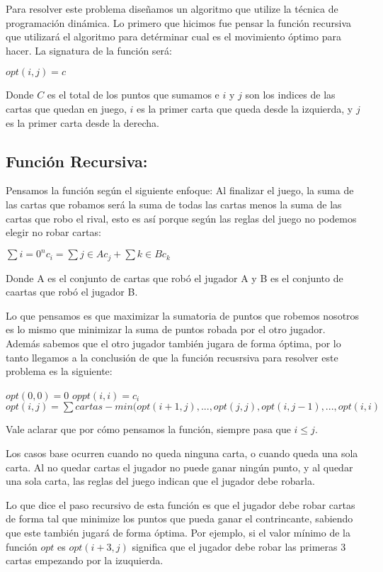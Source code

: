 Para resolver este problema diseñamos un algoritmo que utilize la técnica de programación dinámica. Lo primero que hicimos fue pensar la función recursiva que utilizará el algoritmo para detérminar cual es el movimiento óptimo para hacer. La signatura de la función será:

$opt(i,j) = c$

Donde $C$ es el total de los puntos que sumamos e $i$ y $j$ son los indices de las cartas que quedan en juego, $i$ es la primer carta que queda desde la izquierda, y $j$ es la primer carta desde la derecha.

\subsection{Función Recursiva:}

Pensamos la función según el siguiente enfoque: Al finalizar el juego, la suma de las cartas que robamos será la suma de todas las cartas menos la suma de las cartas que robo el rival, esto es así porque según las reglas del juego no podemos elegir no robar cartas:

$\sum{i=0}^{n} c_i = \sum{j \in A} c_j + \sum{k \in B} c_k$

Donde A es el conjunto de cartas que robó el jugador A y B es el conjunto de caartas que robó el jugador B.

Lo que pensamos es que maximizar la sumatoria de puntos que robemos nosotros es lo mismo que minimizar la suma de puntos robada por el otro jugador. Además sabemos que el otro jugador también jugara de forma óptima, por lo tanto llegamos a la conclusión de que la función recusrsiva para resolver este problema es la siguiente:

$opt(0,0) = 0$
$oppt(i,i) = c_i$
$opt(i,j) = \sum cartas - min(opt(i+1, j), ..., opt(j,j), opt(i, j-1), ... ,opt(i,i)$

Vale aclarar que por cómo pensamos la función, siempre pasa que $i \leq j$.

Los casos base ocurren cuando no queda ninguna carta, o cuando queda una sola carta. Al no quedar cartas el jugador no puede ganar ningún punto, y al quedar una sola carta, las reglas del juego indican que el jugador debe robarla.

Lo que dice el paso recursivo de esta función es que el jugador debe robar cartas de forma tal que minimize los puntos que pueda ganar el contrincante, sabiendo que este también jugará de forma óptima. Por ejemplo, si el valor mínimo de la función $opt$ es $opt(i+3,j)$ significa que el jugador debe robar las primeras 3 cartas empezando por la izuquierda.

